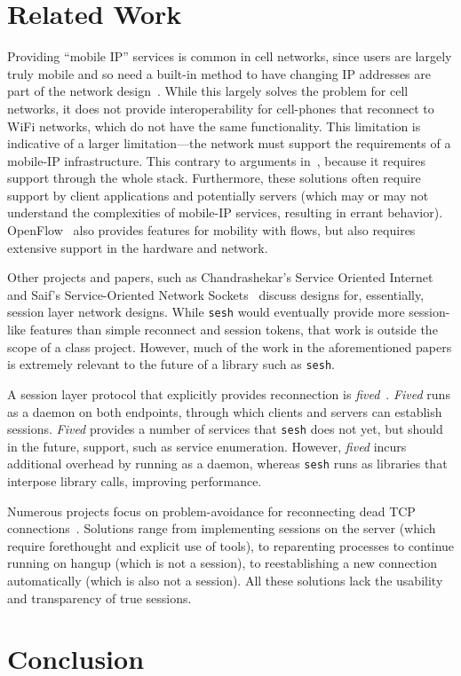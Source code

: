 \documentclass[twocolumn,10pt]{article}
\newcommand{\sesh}{\texttt{sesh}\xspace}
\begin{document}
\section{Related Work}

Providing ``mobile IP'' services is common in cell networks, since users are
largely truly mobile and so need a built-in method to have changing IP addresses
are part of the network design~\cite{ltemob,mobileip,Kurose}. While this largely
solves the problem for cell networks, it does not provide interoperability for
cell-phones that reconnect to WiFi networks, which do not have the same
functionality. This limitation is indicative of a larger limitation---the
network must support the requirements of a mobile-IP infrastructure. This
contrary to arguments in~\cite{Saltzer}, because it requires support through the
whole stack. Furthermore, these solutions often require support by client
applications and potentially servers (which may or may not understand the
complexities of mobile-IP services, resulting in errant behavior).
OpenFlow~\cite{McKeown} also
provides features for mobility with flows, but also requires extensive support
in the hardware and network.

Other projects and papers, such as Chandrashekar's Service Oriented
Internet~\cite{chandrashekar2003service} and Saif's Service-Oriented Network
Sockets~\cite{Saif} discuss designs for, essentially, session layer network designs.
While \sesh would eventually provide more session-like features than
simple reconnect and session tokens, that work is outside the scope of a class
project. However, much of the work in the aforementioned papers is extremely
relevant to the future of a library such as \sesh.

A session layer protocol that explicitly provides reconnection is
\textit{fived}~\cite{wasptr-15-01}. \textit{Fived} runs as a daemon on both
endpoints, through which clients and servers can establish sessions.
\textit{Fived} provides a number of services that \sesh does not yet,
but should in the future, support, such as service enumeration. However,
\textit{fived} incurs additional overhead by running as a daemon, whereas
\sesh runs as libraries that interpose library calls, improving
performance.

Numerous projects focus on problem-avoidance for reconnecting dead TCP
connections~\cite{mosh,autossh,screen,tmux}. Solutions range from implementing
sessions on the server (which require forethought and explicit use of tools), to
reparenting processes to continue running on hangup (which is not a session), to
reestablishing a new connection automatically (which is also not a session). All
these solutions lack the usability and transparency of true sessions.

\section{Conclusion}















\end{document}
